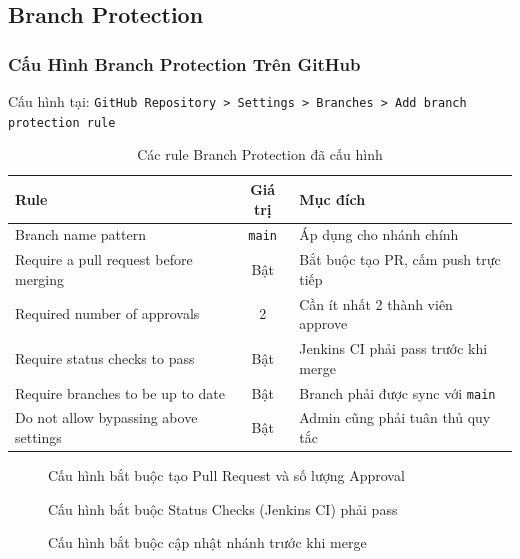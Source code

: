 \subsection{Branch Protection}

\subsubsection{Cấu Hình Branch Protection Trên GitHub}

Cấu hình tại: \texttt{GitHub Repository > Settings > Branches > Add branch protection rule}

\begin{table}[H]
\centering
\caption{Các rule Branch Protection đã cấu hình}
\begin{tabular}{|p{5cm}|c|p{5.5cm}|}
\hline
\textbf{Rule} & \textbf{Giá trị} & \textbf{Mục đích} \\
\hline
Branch name pattern & \texttt{main} & Áp dụng cho nhánh chính \\
\hline
Require a pull request before merging & Bật & Bắt buộc tạo PR, cấm push trực tiếp \\
\hline
Required number of approvals & 2 & Cần ít nhất 2 thành viên approve \\
\hline
Require status checks to pass & Bật & Jenkins CI phải pass trước khi merge \\
\hline
Require branches to be up to date & Bật & Branch phải được sync với \texttt{main} \\
\hline
Do not allow bypassing above settings & Bật & Admin cũng phải tuân thủ quy tắc \\
\hline
\end{tabular}
\end{table}

\begin{figure}[H]
\centering
{}
\caption{Cấu hình bắt buộc tạo Pull Request và số lượng Approval}
\end{figure}

\begin{figure}[H]
\centering
{}
\caption{Cấu hình bắt buộc Status Checks (Jenkins CI) phải pass}
\end{figure}

\begin{figure}[H]
\centering
{}
\caption{Cấu hình bắt buộc cập nhật nhánh trước khi merge}
\end{figure}

